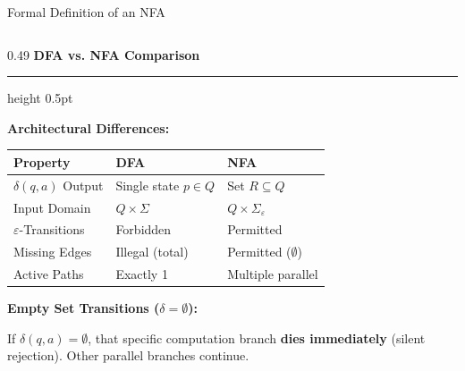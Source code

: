 \documentclass[aspectratio=169, 10pt]{beamer}
\newcommand{\colheader}[1]{%
  {\noindent\footnotesize\bfseries\color{gimpanavy}#1}%
  \vspace{0.02cm}%
  {\color{gimpanavy!30}\hrule height 0.5pt}%
  \vspace{0.05cm}%
}
\newcommand{\alerttitle}[1]{{\noindent\footnotesize\bfseries\color{accentCrimson}#1}\par\vspace{0.03cm}}
\newcommand{\greentitle}[1]{{\noindent\footnotesize\bfseries\color{accentGreen}#1}\par\vspace{0.03cm}}
\begin{document}
\begin{frame}{Formal Definition of an NFA}
\begin{columns}[T]
    \begin{column}{0.49\textwidth}
      \colheader{DFA vs. NFA Comparison}
      \begin{tcolorbox}[examplecard]
        \greentitle{Architectural Differences:}
        \vspace{0.03cm}
        {\scriptsize
        \begin{tabular}{@{} l l l @{}}
          \toprule
          \textbf{Property} & \textbf{DFA} & \textbf{NFA} \\
          \midrule
          $\delta(q, a)$ Output & Single state $p \in Q$ & Set $R \subseteq Q$ \\
          Input Domain & $Q \times \Sigma$ & $Q \times \Sigma_\varepsilon$ \\
          $\varepsilon$-Transitions & Forbidden & Permitted \\
          Missing Edges & Illegal (total) & Permitted ($\emptyset$) \\
          Active Paths & Exactly 1 & Multiple parallel \\
          \bottomrule
        \end{tabular}
        }
      \end{tcolorbox}
      \begin{tcolorbox}[alertcard]
        \alerttitle{Empty Set Transitions ($\delta = \emptyset$):}
        {\scriptsize
        If $\delta(q, a) = \emptyset$, that specific computation branch \textbf{dies immediately} (silent rejection). Other parallel branches continue.
        }
      \end{tcolorbox}
    \end{column}
  \end{columns}
\end{frame}
\end{document}
